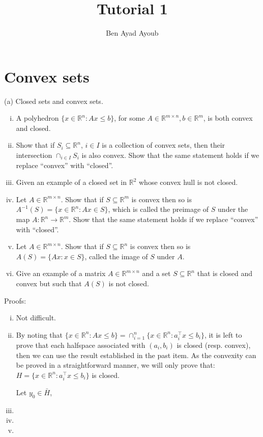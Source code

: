 \documentclass{article}
\theoremstyle{remark}
\theoremstyle{definition}
\def\R{\mathbb{R}}
\begin{document}
\title{Tutorial 1}
\author{\Large Ben Ayad Ayoub}

\bigskip


\maketitle


\tableofcontents


\section{Convex sets}

\noindent
(a) Closed sets and convex sets. 
\begin{enumerate}[i.]
\item A polyhedron $\{x \in \R^n : Ax \leq b \}$, for some $A\in
  \R^{m\times  n},  b\in \R^m$, is both convex and closed.  
\item  Show that if $S_i \subseteq \R^n$, $i\in I$ is a collection of convex 
  sets, then their intersection $\cap_{i\in I} S_i$ is also convex.  Show that
  the same statement holds if we replace ``convex'' with ``closed''.  
\item Given an example of a closed set in $\R^2$ whose convex hull is not
  closed.  
\item Let $A\in\R^{m\times n}$. Show that if $S\subseteq \R^m$ is convex then
  so is $A^{-1}(S) =\{ x \in \R^n : Ax \in S\}$, which is called the preimage of
  $S$ under the map $A :\R^n  \to \R^m$. Show that the same statement holds if
  we replace  ``convex'' with ``closed''.   
\item Let $A\in\R^{m\times n}$.  Show that if $S\subseteq \R^n$ is convex then 
  so is $A(S) = \{ Ax : x \in S \}$, called the image of $S$ under $A$. 
\item  Give an example of a matrix $A\in\R^{m\times n}$ and a set $S\subseteq
  \R^n$ that is closed and convex but such that $A(S)$ is not closed.  
\end{enumerate}

\begin{tcolorbox}
Proofs:
\begin{enumerate}[i.]
\item Not difficult. 
\item By noting that $\{ x \in \R^n: Ax \leq b \} = \cap_{i=1}^n  \{x\in\R^n: a_i^\top x \leq b_i \}$, it is left to prove that each halfspace associated with $(a_i, b_i)$ is closed (resp. convex), then we can use the result established in the past item. As the convexity can be proved in a straightforward manner, we will only prove that: $ H = \{x\in\R^n: a_i^\top x \leq b_i \}$ is closed.

    Let $y_0 \in \bar{H}$, 
    
\item 
\item 
\item 
\end{enumerate}
\end{tcolorbox}
\end{document}
